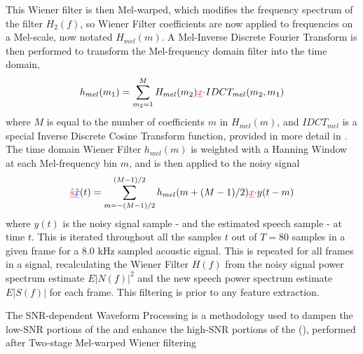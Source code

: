 This \DIFaddbegin {}\DIFaddend Wiener filter is then Mel-warped, which modifies the frequency spectrum of the filter $H_2(f)$, so Wiener Filter coefficients are now applied to frequencies on a Mel-scale, now notated $H_{mel}(m)$.  A Mel-Inverse Discrete Fourier Transform is then performed to transform the Mel-frequency domain filter into the time domain, \begin{equation} h_{mel}(m_1) = \sum_{m_2=1}^{M} H_{mel}(m_2) \DIFdelbegin \DIFdel{x }\DIFdelend \DIFaddbegin \DIFadd{\cdot }\DIFaddend IDCT_{mel}(m_2,m_1) \end{equation} where $M$ is equal to the number of \DIFdelbegin {}\DIFdelend \DIFaddbegin {}\DIFaddend coefficients $m$ in $H_{mel}(m)$, and $IDCT_{mel}$ is a special Inverse Discrete Cosine Transform function, provided in more detail in \cite{etsi:02}.  The time domain Wiener Filter $h_{mel}(m)$ is weighted with a Hanning Window at each Mel-frequency bin $m$, and is then applied to the noisy signal \begin{equation}\DIFdelbegin \DIFdel{ \hat{s}}\DIFdelend \DIFaddbegin \DIFadd{ \hat{x}}\DIFaddend (t) = \sum_{m=-(M-1)/2}^{(M-1)/2} h_{mel}(m+(M-1)/2) \DIFdelbegin \DIFdel{x }\DIFdelend \DIFaddbegin \DIFadd{\cdot }\DIFaddend y(t-m) \end{equation} where $y(t)$ is the noisy signal sample - and \DIFdelbegin {}\DIFdelend \DIFaddbegin {}\DIFaddend the estimated speech sample - at time $t$.  This is iterated throughout all the samples $t$ out of $T=80$ samples in a given \DIFdelbegin {}\DIFdelend \DIFaddbegin {}\DIFaddend frame for a 8.0 kHz sampled acoustic signal.  This is repeated for all frames in a signal, recalculating the Wiener Filter $H(f)$ from the noisy signal power spectrum estimate $E|N(f)|^2$ and the new speech power spectrum estimate $E|S(f)|$ for each frame.  This filtering is \DIFdelbegin {}\DIFdelend \DIFaddbegin {}\DIFaddend prior to any feature extraction.

The SNR-dependent Waveform Processing is a methodology used to dampen the low-SNR portions of the \DIFdelbegin {}\DIFdelend \DIFaddbegin {}\DIFaddend and enhance the high-SNR portions of the \DIFdelbegin {}\DIFdelend \DIFaddbegin {}\DIFaddend (\cite{macho:01}), \DIFdelbegin {}\DIFdelend performed after Two-stage Mel-warped Wiener filtering\DIFdelbegin {}%

